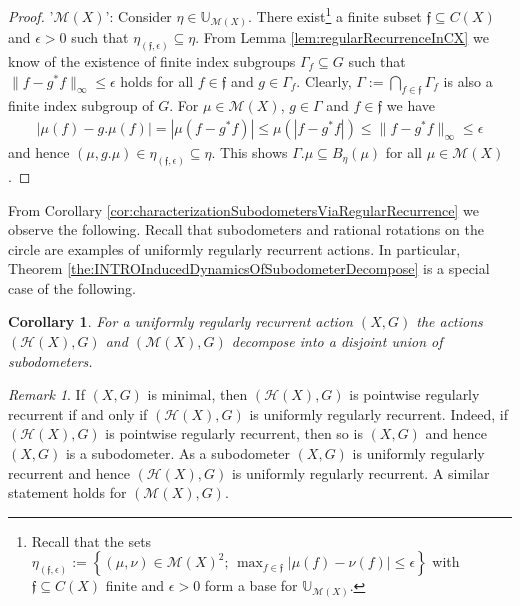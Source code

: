 \documentclass[12pt, reqno]{amsart}
\newtheorem{corollary}[theorem]{Corollary}
\theoremstyle{definition}
\theoremstyle{remark}
\newtheorem{remark}[theorem]{Remark}
\numberwithin{equation}{section}
\theoremstyle{theorem}
\theoremstyle{remark}
\def\hyper{{\mathcal{H}}}
\begin{document}
\begin{proof}
'$\mathcal{M}(X)$': 
    Consider $\eta\in \mathbb{U}_{\mathcal{M}(X)}$. 
    There exist\footnote{
        Recall that the sets $\eta_{(\mathfrak{f},\epsilon)}:=\left\{(\mu,\nu)\in \mathcal{M}(X)^2;\, \max_{f\in \mathfrak{f}}|\mu(f)-\nu(f)|\leq\epsilon\right\}$ with $\mathfrak{f}\subseteq C(X)$ finite and $\epsilon>0$
        form a base for $\mathbb{U}_{\mathcal{M}(X)}$. 
    } a finite subset $\mathfrak{f}\subseteq C(X)$ and $\epsilon>0$ such that
    $\eta_{(\mathfrak{f},\epsilon)}\subseteq \eta$. 
    From Lemma \ref{lem:regularRecurrenceInCX} we know of the existence of finite index subgroups $\Gamma_f\subseteq G$ such that 
    $\|f-g^*f\|_\infty\leq \epsilon$ 
    holds
    for all $f\in \mathfrak{f}$ and $g\in \Gamma_f$.     
    Clearly, $\Gamma:=\bigcap_{f\in \mathfrak{f}}\Gamma_f$ is also a finite index subgroup of $G$. 
    For $\mu \in \mathcal{M}(X)$, $g\in \Gamma$ and $f\in \mathfrak{f}$ we have
    \begin{align*}
        |\mu(f)-g.\mu(f)|
        =|\mu(f-g^*f)|
        \leq \mu(|f-g^*f|)
        \leq \|f-g^*f\|_\infty\leq \epsilon
    \end{align*}
    and hence $(\mu,g.\mu)\in \eta_{(\mathfrak{f},\epsilon)}\subseteq \eta$. This shows $\Gamma.\mu \subseteq B_\eta(\mu)$ for all $\mu\in \mathcal{M}(X)$. 
\end{proof}

From Corollary \ref{cor:characterizationSubodometersViaRegularRecurrence} we observe the following. Recall that subodometers and rational rotations on the circle are examples of uniformly regularly recurrent actions. In particular, Theorem \ref{the:INTROInducedDynamicsOfSubodometerDecompose} is a special case of the following. 

\begin{corollary}
\label{cor:InducedDynamicsDecompose}
    For a uniformly regularly recurrent action $(X,G)$ the actions $(\hyper(X),G)$ and $(\mathcal{M}(X),G)$ decompose into a disjoint union of subodometers. 
\end{corollary}

\begin{remark}
    If $(X,G)$ is minimal, then $(\hyper(X),G)$ is pointwise regularly recurrent if and only if $(\hyper(X),G)$ is uniformly regularly recurrent. 
    Indeed, if $(\hyper(X),G)$ is pointwise regularly recurrent, then so is $(X,G)$ and hence $(X,G)$ is a subodometer. 
    As a subodometer $(X,G)$ is uniformly regularly recurrent and hence $(\hyper(X),G)$ is uniformly regularly recurrent. 
    A similar statement holds for $(\mathcal{M}(X),G)$. 
\end{remark}
\end{document}

